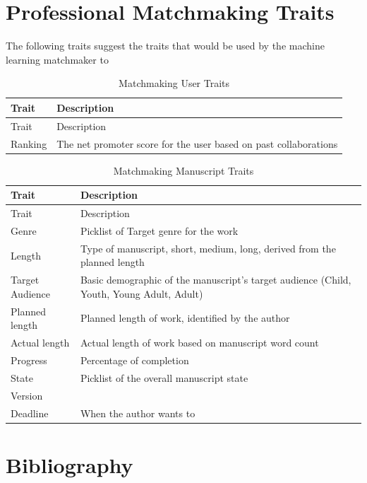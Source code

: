 \documentclass[10pt,openany]{book}
\begin{document}
\hypertarget{professional-matchmaking-traits}{%
\section{Professional Matchmaking
Traits}\label{professional-matchmaking-traits}}

The following traits suggest the traits that would be used by the
machine learning matchmaker to

\begin{longtable}[]{@{}ll@{}}
\caption{Matchmaking User Traits}\tabularnewline
\toprule
Trait & Description\tabularnewline
\midrule
\endfirsthead
\toprule
Trait & Description\tabularnewline
\midrule
\endhead
Ranking & The net promoter score for the user based on past
collaborations\tabularnewline
\bottomrule
\end{longtable}

\begin{longtable}[]{@{}ll@{}}
\caption{Matchmaking Manuscript Traits}\tabularnewline
\toprule
Trait & Description\tabularnewline
\midrule
\endfirsthead
\toprule
Trait & Description\tabularnewline
\midrule
\endhead
Genre & Picklist of Target genre for the work\tabularnewline
Length & Type of manuscript, short, medium, long, derived from the
planned length\tabularnewline
Target Audience & Basic demographic of the manuscript's target audience
(Child, Youth, Young Adult, Adult)\tabularnewline
Planned length & Planned length of work, identified by the
author\tabularnewline
Actual length & Actual length of work based on manuscript word
count\tabularnewline
Progress & Percentage of completion\tabularnewline
State & Picklist of the overall manuscript state\tabularnewline
Version &\tabularnewline
Deadline & When the author wants to\tabularnewline
\bottomrule
\end{longtable}

\newpage

\hypertarget{bibliography}{%
\section*{Bibliography}\label{bibliography}}
\end{document}
